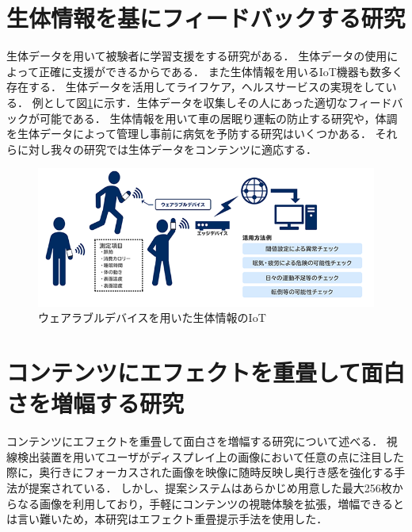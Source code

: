 \section{生体情報を基にフィードバックする研究}

生体データを用いて被験者に学習支援をする研究がある\cite{seitai1,seitai2,seitai3}．
生体データの使用によって正確に支援ができるからである．
また生体情報を用いるIoT機器も数多く存在する．
生体データを活用してライフケア，ヘルスサービスの実現をしている．
例として図\ref{iot}に示す．生体データを収集しその人にあった適切なフィードバックが可能である．
生体情報を用いて車の居眠り運転の防止する研究\cite{unten}や，体調を生体データによって管理し事前に病気を予防する研究\cite{kibun,yobou,yobou2}はいくつかある．
それらに対し我々の研究では生体データをコンテンツに適応する．

\begin{figure}[H]
    \centering
    \includegraphics[width=15cm]{images/chapter2/body_img02.png}
    \caption{ウェアラブルデバイスを用いた生体情報のIoT\cite{nec}}
    \label{iot}
\end{figure}


\section{コンテンツにエフェクトを重畳して面白さを増幅する研究}
コンテンツにエフェクトを重畳して面白さを増幅する研究について述べる．
視線検出装置を用いてユーザがディスプレイ上の画像において任意の点に注目した際に，奥行きにフォーカスされた画像を映像に随時反映し奥行き感を強化する手法が提案されている\cite{shamo1,shamo2}．
しかし、提案システムはあらかじめ用意した最大256枚からなる画像を利用しており，手軽にコンテンツの視聴体験を拡張，増幅できるとは言い難いため\cite{shamo3}，本研究はエフェクト重畳提示手法を使用した． 

